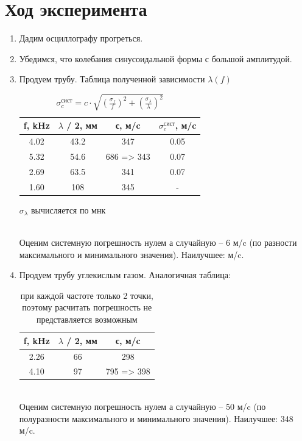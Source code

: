 \documentclass[11pt,a4paper]{article}
\begin{document}
\section*{Ход эксперимента}
\begin{enumerate}
  \item Дадим  осциллографу прогреться.
  \item Убедимся, что колебания синусоидальной формы с большой амплитудой.
  \item Продуем трубу. Таблица полученной зависимости $\lambda(f)$
  \begin{table}[h!]
    \begin{center}
    \begin{tabular}{|c|c|c|c|}
    \hline
    f, kHz & $\lambda$ / 2, мм & с, м/c & $\sigma_c^\text{сист}$, м/c\\ \hline
    4.02 & 43.2&  347              &  0.05\\ \hline
    5.32 & 54.6&  686 => 343       &  0.07\\ \hline
    2.69 & 63.5&  341              &  0.07\\ \hline
    1.60 & 108 &  345              &  -\\ \hline
    \end{tabular}
    \caption{$\sigma_c^\text{сист} = c \cdot \sqrt{
      (\frac{\sigma_f}{f})^2 + (\frac{\sigma_\lambda}{\lambda})^2}$}
    \end{center}
    $\sigma_\lambda$ вычисляется по мнк
\end{table}\\
Оценим системную погрешность нулем а случайную -- 6 м/c (по разности максимального и минимального значения).
Наилучшее:  м/c.
  \item Продуем трубу углекислым газом. Аналогичная таблица:
  \begin{table}[h!]
    \begin{center}
    \begin{tabular}{|c|c|c|}
    \hline
    f, kHz & $\lambda$ / 2, мм &  с, м/c     \\ \hline
    2.26   & 66                &  298        \\ \hline
    4.10   & 97                &  795 => 398 \\ \hline
    \end{tabular}
    \caption{при каждой частоте только 2 точки, поэтому расчитать погрешность не представляется возможным}
    \end{center}
  \end{table}\\
  Оценим системную погрешность нулем а случайную -- 50 м/c (по полуразности максимального и минимального значения).
Наилучшее: 348 м/c.


\end{enumerate}
\end{document}
